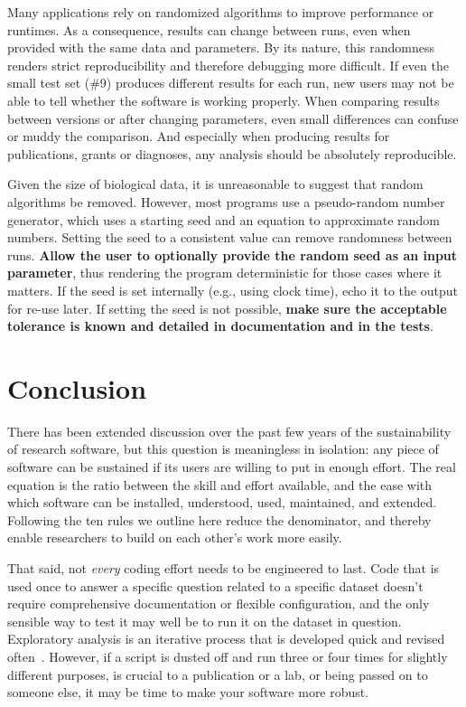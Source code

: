 \documentclass[10pt,letterpaper]{article}
\newcommand{\ruleminor}[1]{\textbf{#1}}
\begin{document}
Many applications rely on randomized algorithms to
improve performance or runtimes. As a consequence, results can change
between runs, even when provided with the same data and parameters. By
its nature, this randomness renders strict reproducibility and therefore
debugging more difficult. If even the small test set (\#9) produces
different results for each run, new users may not be able to tell whether the software is
working properly. When comparing
results between versions or after changing parameters, even small
differences can confuse or muddy the comparison. And especially when
producing results for publications, grants or diagnoses, any analysis
should be absolutely reproducible.

Given the size of biological data, it is unreasonable to suggest that
random algorithms be removed. However, most programs use a pseudo-random
number generator, which uses a starting seed and an equation to
approximate random numbers. Setting the seed to a consistent value
can remove randomness between runs. \ruleminor{Allow the user to optionally provide
the random seed as an input parameter}, thus rendering the program deterministic
for those cases where it matters. If the seed is set internally (e.g.,
using clock time), echo it to the output for re-use later.
If setting the seed is not possible, \ruleminor{make sure the acceptable tolerance is
known and detailed in documentation and in the tests}.

\section*{Conclusion}

There has been extended discussion over the past few years of the
sustainability of research software, but this question is meaningless
in isolation: any piece of software can be sustained if its users are
willing to put in enough effort.  The real equation is the ratio
between the skill and effort available, and the ease with which
software can be installed, understood, used, maintained, and extended.
Following the ten rules we outline here reduce the denominator, and
thereby enable researchers to build on each other's work more easily.

That said, not \emph{every} coding effort needs to be engineered to
last.  Code that is used once to answer a specific question related to
a specific dataset doesn't require comprehensive documentation or
flexible configuration, and the only sensible way to test it may well
be to run it on the dataset in question. Exploratory analysis is an
iterative process that is developed quick and revised
often~\cite{lawlor2015,sanders2008}.  However, if a script is dusted
off and run three or four times for slightly different purposes, is
crucial to a publication or a lab, or being passed on to someone else,
it may be time to make your software more robust.


\end{document}
